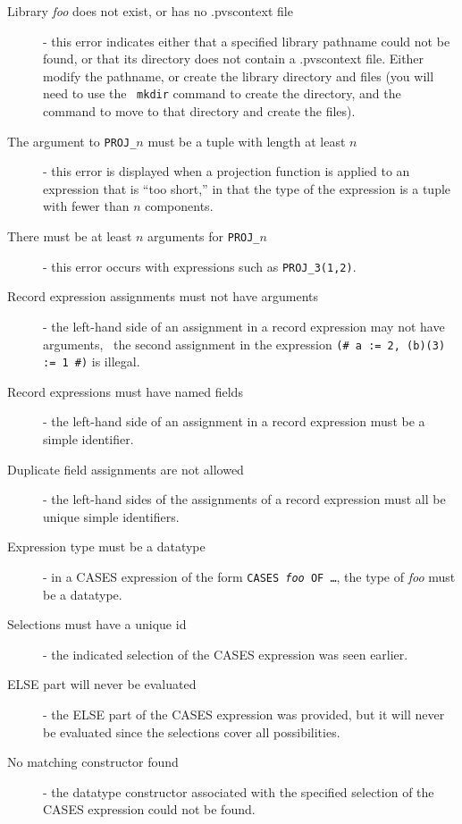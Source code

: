\begin{description}
\item[Library \emph{foo} does not exist, or has no .pvscontext file] -
this error indicates either that a specified library pathname could not be
found, or that its directory does not contain a .pvscontext file.  Either
modify the pathname, or create the library directory and files (you will
need to use the \unix\ \texttt{mkdir} command to create the directory,
and the  command to move to that directory and
create the files).

\item[The argument to \texttt{PROJ\_}$n$ must be a tuple with length at
least $n$] - this error is displayed when a projection function is applied
to an expression that is ``too short,'' in that the type of the expression
is a tuple with fewer than $n$ components.

\item[There must be at least $n$ arguments for \texttt{PROJ\_}$n$] - this
error occurs with expressions such as \texttt{PROJ\_3(1,2)}.

\item[Record expression assignments must not have arguments] - the
left-hand side of an assignment in a record expression may not have
arguments, \eg\ the second assignment in the expression \texttt{(\# a := 2,
(b)(3) := 1 \#)} is illegal.

\item[Record expressions must have named fields] - the left-hand side of
an assignment in a record expression must be a simple identifier.

\item[Duplicate field assignments are not allowed] - the left-hand sides
of the assignments of a record expression must all be unique simple
identifiers.

\item[Expression type must be a datatype] - in a CASES expression of the
form \texttt{CASES \emph{foo} OF \ldots}, the type of \emph{foo} must be a
datatype.

\item[Selections must have a unique id] - the indicated selection of the
CASES expression was seen earlier.

\item[ELSE part will never be evaluated] - the ELSE part of the CASES
expression was provided, but it will never be evaluated since the
selections cover all possibilities.

\item[No matching constructor found] - the datatype constructor associated
with the specified selection of the CASES expression could not be found.


\end{description}
